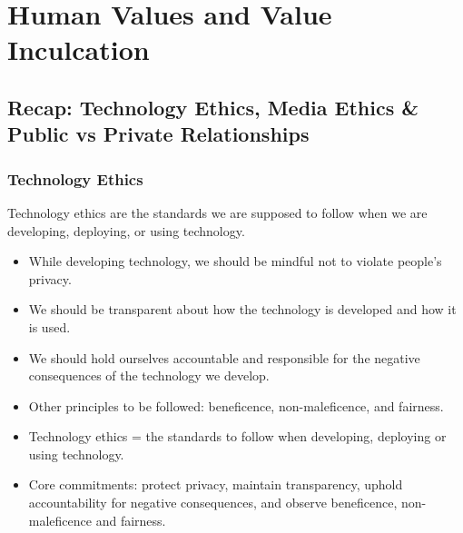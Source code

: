 
\chapter{Human Values and Value Inculcation}


\vspace{14pt}

\section{Recap: Technology Ethics, Media Ethics \& Public vs Private Relationships}

\subsection{Technology Ethics}

Technology ethics are the standards we are supposed to follow when we are developing, deploying, or using technology.

\begin{itemize}
\item While developing technology, we should be mindful not to violate people's privacy.
\item We should be transparent about how the technology is developed and how it is used.
\item We should hold ourselves accountable and responsible for the negative consequences of the technology we develop.
\item Other principles to be followed: beneficence, non-maleficence, and fairness.
\end{itemize}

\begin{KeyConcept}
\begin{itemize}
\item Technology ethics = the standards to follow when developing, deploying or using technology.
\item Core commitments: protect privacy, maintain transparency, uphold accountability for negative consequences, and observe beneficence, non-maleficence and fairness.
\end{itemize}
\end{KeyConcept}

